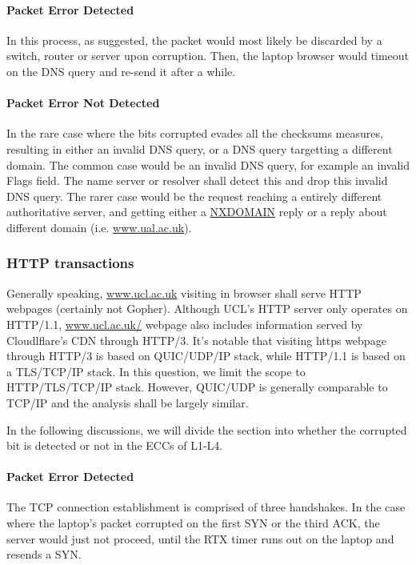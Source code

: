 \documentclass[12pt,letterpaper]{article}
\begin{document}
\paragraph{Packet Error Detected}

In this process, as suggested, the packet would most likely be discarded by a switch, router or server upon corruption. Then, the laptop browser would timeout on the DNS query and re-send it after a while. 

\paragraph{Packet Error Not Detected}

In the rare case where the bits corrupted evades all the checksums measures, resulting in either an invalid DNS query, or a DNS query targetting a different domain. The common case would be an invalid DNS query, for example an invalid Flags field. The name server or resolver shall detect this and drop this invalid DNS query. The rarer case would be the request reaching a entirely different authoritative server, and getting either a \url{NXDOMAIN} reply or a reply about different domain (i.e. \url{www.ual.ac.uk}).

\subsubsection{HTTP transactions}

Generally speaking, \url{www.ucl.ac.uk} visiting in browser shall serve HTTP webpages (certainly not Gopher). Although UCL's HTTP server only operates on HTTP/1.1, \url{www.ucl.ac.uk/} webpage also includes information served by Cloudlflare's CDN through HTTP/3. It's notable that visiting https webpage through HTTP/3 is based on QUIC/UDP/IP stack, while HTTP/1.1 is based on a TLS/TCP/IP stack. In this question, we limit the scope to HTTP/TLS/TCP/IP stack. However, QUIC/UDP is generally comparable to TCP/IP and the analysis shall be largely similar.

In the following discussions, we will divide the section into whether the corrupted bit is detected or not in the ECCs of L1-L4.

\paragraph{Packet Error Detected}

The TCP connection establishment is comprised of three handshakes. In the case where the laptop's packet corrupted on the first SYN or the third ACK, the server would just not proceed, until the RTX timer runs out on the laptop and resends a SYN.
\end{document}
